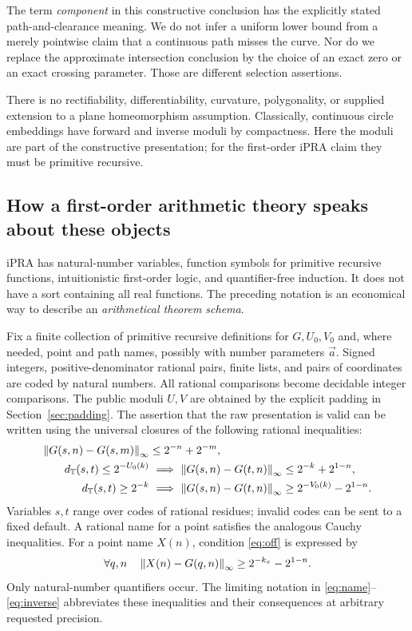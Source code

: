 The term \emph{component} in this constructive conclusion has the explicitly
stated path-and-clearance meaning. We do not infer a uniform lower bound
from a merely pointwise claim that a continuous path misses the curve.
Nor do we replace the approximate intersection conclusion by the choice
of an exact zero or an exact crossing parameter. Those are different
selection assertions.

There is no rectifiability, differentiability, curvature, polygonality,
or supplied extension to a plane homeomorphism assumption. Classically,
continuous circle embeddings have forward and inverse moduli by
compactness. Here the moduli are part of the constructive presentation;
for the first-order iPRA claim they must be primitive recursive.

\subsection{How a first-order arithmetic theory speaks about these objects}
\label{sec:names}

iPRA has natural-number variables, function symbols for primitive recursive
functions, intuitionistic first-order logic, and quantifier-free induction.
It does not have a sort containing all real functions.
The preceding notation is an economical way to describe an
\emph{arithmetical theorem schema}.

Fix a finite collection of primitive recursive definitions for $G,U_0,V_0$
and, where needed, point and path names, possibly with number parameters
$\vec a$. Signed integers, positive-denominator rational pairs, finite
lists, and pairs of coordinates are coded by natural numbers.
All rational comparisons become decidable integer comparisons.
The public moduli $U,V$ are obtained by the explicit padding in
Section~\ref{sec:padding}. The assertion that the raw presentation
is valid can be written using the universal closures of the
following rational inequalities:
\begin{align}
\left\lVert G(s,n)-G(s,m)\right\rVert_\infty
 &\le 2^{-n}+2^{-m},\label{eq:arithC}\\
d_\mathbb T(s,t)\le 2^{-U_0(k)}
 &\ \Longrightarrow\
 \left\lVert G(s,n)-G(t,n)\right\rVert_\infty\le 2^{-k}+2^{1-n},\label{eq:arithU}\\
d_\mathbb T(s,t)\ge 2^{-k}
 &\ \Longrightarrow\
 \left\lVert G(s,n)-G(t,n)\right\rVert_\infty\ge 2^{-V_0(k)}-2^{1-n}.
 \label{eq:arithV}
\end{align}
Variables $s,t$ range over codes of rational residues; invalid codes can
be sent to a fixed default. A rational name for a point satisfies the
analogous Cauchy inequalities. For a point name $X(n)$, condition
\eqref{eq:off} is expressed by
\[
 \forall q,n\quad
 \left\lVert X(n)-G(q,n)\right\rVert_\infty\ge 2^{-k_x}-2^{1-n}.
\]
Only natural-number quantifiers occur. The limiting notation in
\eqref{eq:name}--\eqref{eq:inverse} abbreviates these inequalities and
their consequences at arbitrary requested precision.

